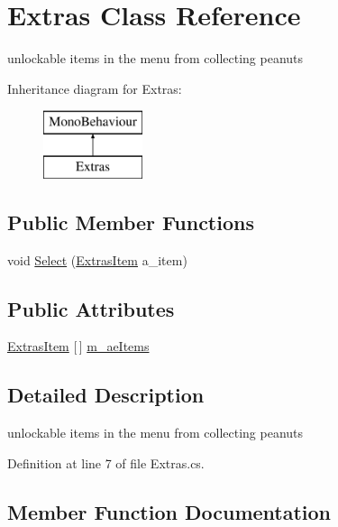 \hypertarget{class_extras}{}\section{Extras Class Reference}
\label{class_extras}


unlockable items in the menu from collecting peanuts  


Inheritance diagram for Extras\+:\begin{figure}[H]
\begin{center}
\leavevmode
\includegraphics[height=2.000000cm]{class_extras}
\end{center}
\end{figure}
\subsection*{Public Member Functions}
\begin{DoxyCompactItemize}
\item 
void \mbox{\hyperlink{class_extras_aabee41d1ca362ddf96b2fcd2c54ecd64}{Select}} (\mbox{\hyperlink{class_extras_item}{Extras\+Item}} a\+\_\+item)
\end{DoxyCompactItemize}
\subsection*{Public Attributes}
\begin{DoxyCompactItemize}
\item 
\mbox{\hyperlink{class_extras_item}{Extras\+Item}} \mbox{[}$\,$\mbox{]} \mbox{\hyperlink{class_extras_af8d4902314e290df5f39c6e8dc3efb57}{m\+\_\+ae\+Items}}
\end{DoxyCompactItemize}


\subsection{Detailed Description}
unlockable items in the menu from collecting peanuts 



Definition at line 7 of file Extras.\+cs.



\subsection{Member Function Documentation}
\mbox{\label{class_extras_aabee41d1ca362ddf96b2fcd2c54ecd64}} 
